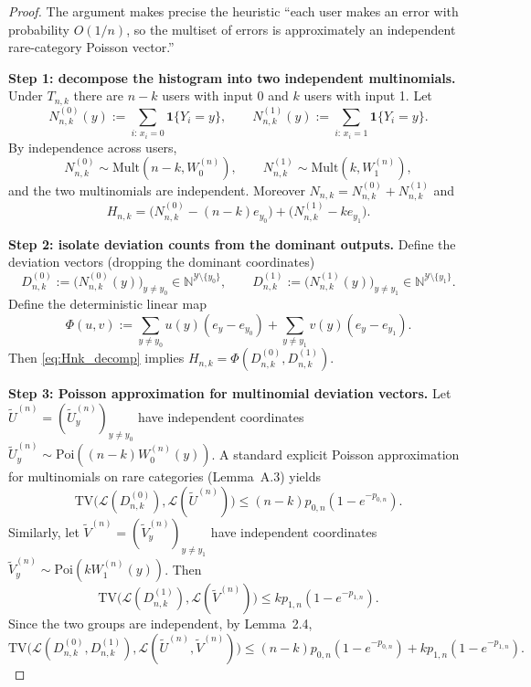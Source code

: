 \documentclass{article}
\begin{document}
\begin{proof}
The argument makes precise the heuristic ``each user makes an error with probability $O(1/n)$,
so the multiset of errors is approximately an independent rare-category Poisson vector.''

\textbf{Step 1: decompose the histogram into two independent multinomials.} Under $T_{n,k}$
there are $n-k$ users with input 0 and $k$ users with input 1. Let
\[
N^{(0)}_{n,k}(y) := \sum_{i:\, x_i=0} \mathbf{1}\{Y_i = y\}, \qquad N^{(1)}_{n,k}(y) := \sum_{i:\, x_i=1} \mathbf{1}\{Y_i = y\}.
\]
By independence across users,
\[
N^{(0)}_{n,k} \sim \mathrm{Mult}(n-k, W^{(n)}_0), \qquad N^{(1)}_{n,k} \sim \mathrm{Mult}(k, W^{(n)}_1),
\]
and the two multinomials are independent. Moreover $N_{n,k} = N^{(0)}_{n,k} + N^{(1)}_{n,k}$ and
\begin{equation}
H_{n,k} = \bigl(N^{(0)}_{n,k} - (n-k)e_{y_0}\bigr) + \bigl(N^{(1)}_{n,k} - k e_{y_1}\bigr). \label{eq:Hnk_decomp}
\end{equation}

\textbf{Step 2: isolate deviation counts from the dominant outputs.} Define the deviation vectors (dropping the dominant coordinates)
\[
D^{(0)}_{n,k} := \bigl(N^{(0)}_{n,k}(y)\bigr)_{y \neq y_0} \in \mathbb{N}^{\mathcal{Y}\setminus\{y_0\}}, \qquad D^{(1)}_{n,k} := \bigl(N^{(1)}_{n,k}(y)\bigr)_{y \neq y_1} \in \mathbb{N}^{\mathcal{Y}\setminus\{y_1\}}.
\]
Define the deterministic linear map
\begin{equation}
\Phi(u, v) := \sum_{y \neq y_0} u(y)(e_y - e_{y_0}) + \sum_{y \neq y_1} v(y)(e_y - e_{y_1}). \label{eq:Phi}
\end{equation}
Then \eqref{eq:Hnk_decomp} implies $H_{n,k} = \Phi(D^{(0)}_{n,k}, D^{(1)}_{n,k})$.

\textbf{Step 3: Poisson approximation for multinomial deviation vectors.} Let $\tilde{U}^{(n)} = (\tilde{U}^{(n)}_y)_{y \neq y_0}$
have independent coordinates $\tilde{U}^{(n)}_y \sim \mathrm{Poi}((n-k)W^{(n)}_0(y))$. A standard explicit Poisson approximation for multinomials on rare categories (Lemma~A.3) yields
\begin{equation}
\mathrm{TV}\bigl(\mathcal{L}(D^{(0)}_{n,k}), \mathcal{L}(\tilde{U}^{(n)})\bigr) \leq (n-k)p_{0,n}(1 - e^{-p_{0,n}}). \label{eq:TV_D0}
\end{equation}
Similarly, let $\tilde{V}^{(n)} = (\tilde{V}^{(n)}_y)_{y \neq y_1}$ have independent coordinates $\tilde{V}^{(n)}_y \sim \mathrm{Poi}(k W^{(n)}_1(y))$. Then
\begin{equation}
\mathrm{TV}\bigl(\mathcal{L}(D^{(1)}_{n,k}), \mathcal{L}(\tilde{V}^{(n)})\bigr) \leq k p_{1,n}(1 - e^{-p_{1,n}}). \label{eq:TV_D1}
\end{equation}
Since the two groups are independent, by Lemma~2.4,
\[
\mathrm{TV}\bigl(\mathcal{L}(D^{(0)}_{n,k}, D^{(1)}_{n,k}), \mathcal{L}(\tilde{U}^{(n)}, \tilde{V}^{(n)})\bigr) \leq (n-k)p_{0,n}(1-e^{-p_{0,n}}) + k p_{1,n}(1-e^{-p_{1,n}}).
\]


\end{proof}
\end{document}
